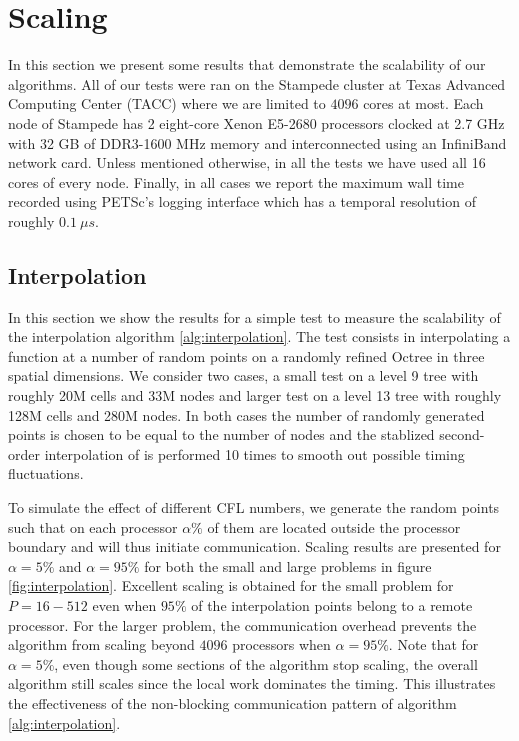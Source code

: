 \section{Scaling} \label{sec:scaling}
In this section we present some results that demonstrate the scalability of our algorithms. All of our tests were ran on the Stampede cluster at Texas Advanced Computing Center (TACC) where we are limited to $4096$ cores at most. Each node of Stampede has 2 eight-core Xenon E5-2680 processors clocked at 2.7 GHz with 32 GB of DDR3-1600 MHz memory and interconnected using an InfiniBand network card. Unless mentioned otherwise, in all the tests we have used all 16 cores of every node. Finally, in all cases we report the maximum wall time recorded using PETSc's logging interface which has a temporal resolution of roughly $0.1 \: \mu s$.

\subsection{Interpolation}
In this section we show the results for a simple test to measure the scalability of the interpolation algorithm \ref{alg:interpolation}. The test consists in interpolating a function at a number of random points on a randomly refined Octree in three spatial dimensions. We consider two cases, a small test on a level 9 tree with roughly 20M cells and 33M nodes and larger test on a level 13 tree with roughly 128M cells and 280M nodes. In both cases the number of randomly generated points is chosen to be equal to the number of nodes and the stablized second-order interpolation of \cite{Min;Gibou:07:A-second-order-accur} is performed 10 times to smooth out possible timing fluctuations.

To simulate the effect of different CFL numbers, we generate the random points such that on each processor $\alpha\%$ of them are located outside the processor boundary and will thus initiate communication. Scaling results are presented for $\alpha = 5 \%$ and $\alpha = 95\%$ for both the small and large problems in figure \ref{fig:interpolation}. Excellent scaling is obtained for the small problem for $P = 16-512$ even when $95\%$ of the interpolation points belong to a remote processor. For the larger problem, the communication overhead prevents the algorithm from scaling beyond $4096$ processors when $\alpha = 95\%$. Note that for $\alpha = 5\%$, even though some sections of the algorithm stop scaling, the overall algorithm still scales since the local work dominates the timing. This illustrates the effectiveness of the non-blocking communication pattern of algorithm \ref{alg:interpolation}.

